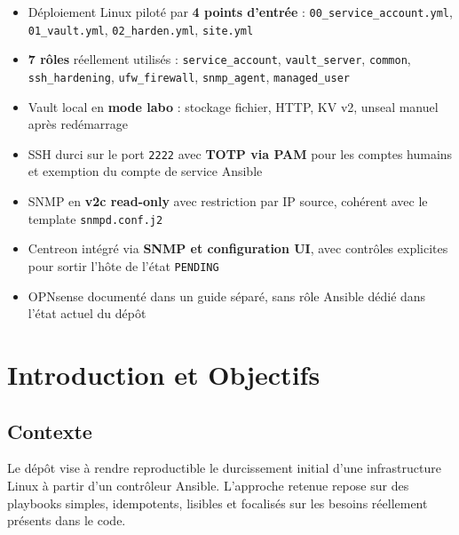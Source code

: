 \documentclass[11pt,a4paper]{article}
\newcommand{\iconResultsW}{\textcolor{white}{\faChartBar}}
\begin{document}
\begin{tcolorbox}[
  enhanced,
  colback=PrimaryBlueLight,
  colframe=PrimaryBlue,
  boxrule=1.2pt,
  arc=8pt,
  left=14pt,right=14pt,top=10pt,bottom=10pt,
  title={\iconResultsW\hspace{0.4em}\textbf{État réellement implémenté}},
  fonttitle=\bfseries\normalsize,
  coltitle=white,
  attach boxed title to top left={yshift=-2mm,xshift=6mm},
  boxed title style={colback=PrimaryBlue,arc=4pt,boxrule=0pt}
]
\begin{itemize}
  \item Déploiement Linux piloté par \textbf{4 points d'entrée} : \texttt{00\_service\_account.yml}, \texttt{01\_vault.yml}, \texttt{02\_harden.yml}, \texttt{site.yml}
  \item \textbf{7 rôles} réellement utilisés : \texttt{service\_account}, \texttt{vault\_server}, \texttt{common}, \texttt{ssh\_hardening}, \texttt{ufw\_firewall}, \texttt{snmp\_agent}, \texttt{managed\_user}
  \item Vault local en \textbf{mode labo} : stockage fichier, HTTP, KV v2, unseal manuel après redémarrage
  \item SSH durci sur le port \texttt{2222} avec \textbf{TOTP via PAM} pour les comptes humains et exemption du compte de service Ansible
  \item SNMP en \textbf{v2c read-only} avec restriction par IP source, cohérent avec le template \texttt{snmpd.conf.j2}
  \item Centreon intégré via \textbf{SNMP et configuration UI}, avec contrôles explicites pour sortir l'hôte de l'état \texttt{PENDING}
  \item OPNsense documenté dans un guide séparé, sans rôle Ansible dédié dans l'état actuel du dépôt
\end{itemize}
\end{tcolorbox}

\section{Introduction et Objectifs}

\subsection{Contexte}

Le dépôt vise à rendre reproductible le durcissement initial d'une infrastructure Linux à partir d'un contrôleur Ansible. L'approche retenue repose sur des playbooks simples, idempotents, lisibles et focalisés sur les besoins réellement présents dans le code.
\end{document}
